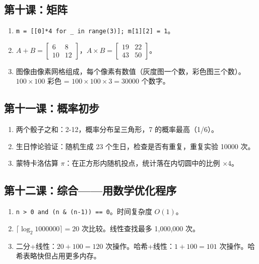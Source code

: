 \documentclass[a4paper,12pt]{ctexart}
\begin{document}
\subsection*{第十课：矩阵}
\begin{enumerate}
  \item \texttt{m = [[0]*4 for _ in range(3)]; m[1][2] = 1}。
  \item $A+B = \begin{bmatrix}6 & 8 \\ 10 & 12\end{bmatrix}$，$A \times B = \begin{bmatrix}19 & 22 \\ 43 & 50\end{bmatrix}$。
  \item 图像由像素网格组成，每个像素有数值（灰度图一个数，彩色图三个数）。$100 \times 100$ 彩色 = $100 \times 100 \times 3 = 30000$ 个数字。
\end{enumerate}

\subsection*{第十一课：概率初步}
\begin{enumerate}
  \item 两个骰子之和：2-12，概率分布呈三角形，7 的概率最高（1/6）。
  \item 生日悖论验证：随机生成 23 个生日，检查是否有重复，重复实验 10000 次。
  \item 蒙特卡洛估算 $\pi$：在正方形内随机投点，统计落在内切圆中的比例 $\times 4$。
\end{enumerate}

\subsection*{第十二课：综合——用数学优化程序}
\begin{enumerate}
  \item \texttt{n > 0 and (n \& (n-1)) == 0}。时间复杂度 $O(1)$。
  \item $\lceil \log_2 1000000 \rceil = 20$ 次比较。线性查找最多 1,000,000 次。
  \item 二分+线性：$20 + 100 = 120$ 次操作。哈希+线性：$1 + 100 = 101$ 次操作。哈希表略快但占用更多内存。
\end{enumerate}
\end{document}
